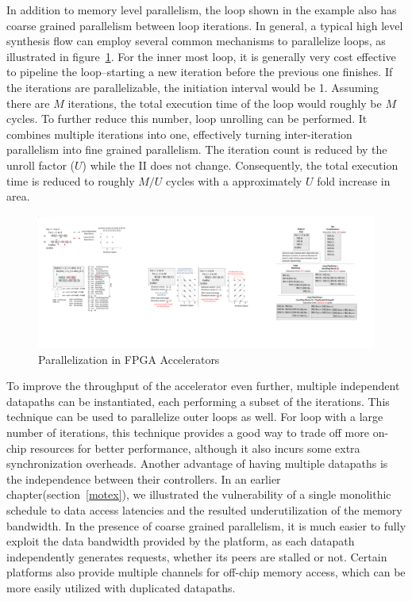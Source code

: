 In addition to memory level parallelism, the loop shown in the example also has coarse grained parallelism between loop iterations. In general, a typical high level synthesis flow can employ several common mechanisms to parallelize loops, as illustrated in figure~\ref{fig:fpgaparal}. 
For the inner most
loop, it is generally very cost effective to pipeline the loop--starting a new iteration before the previous one finishes. If
the iterations are parallelizable, the initiation interval would be 1.
Assuming there are $M$ iterations, the total execution time of the loop
would roughly be $M$ cycles. To further reduce this number, loop unrolling
can be performed. It combines multiple iterations into one, effectively
turning inter-iteration parallelism into fine grained parallelism. 
The iteration count is reduced by the unroll factor ($U$) while the II does not change. Consequently, the total execution time is reduced to roughly $M/U$ cycles with a approximately $U$ fold increase in area. 

\begin{figure}[htp]
\begin{center}
\includegraphics[width=0.8\linewidth]{chap6fig/fpgaParallel.pdf}
\caption{Parallelization in FPGA Accelerators
\label{fig:fpgaparal}}
\end{center}
\end{figure}

To improve the throughput of the accelerator even further, multiple
independent datapaths can be instantiated, each performing a subset of 
the iterations. This technique can be used to parallelize outer loops
as well. For loop with a large number of iterations, this technique provides a good way to trade off more on-chip resources for better performance, although
it also incurs some extra synchronization overheads. Another advantage of
having multiple datapaths is the independence between their controllers.
In an earlier chapter(section~\ref{motex}), we illustrated the vulnerability
of a single monolithic schedule to data access latencies and the resulted
underutilization of the memory bandwidth. In the presence of coarse grained parallelism, it is much easier to fully exploit the data bandwidth provided
by the platform, as each datapath independently generates requests, whether
its peers are stalled or not. 
Certain platforms also provide multiple channels
for off-chip memory access, which can be more easily utilized with duplicated datapaths. 

